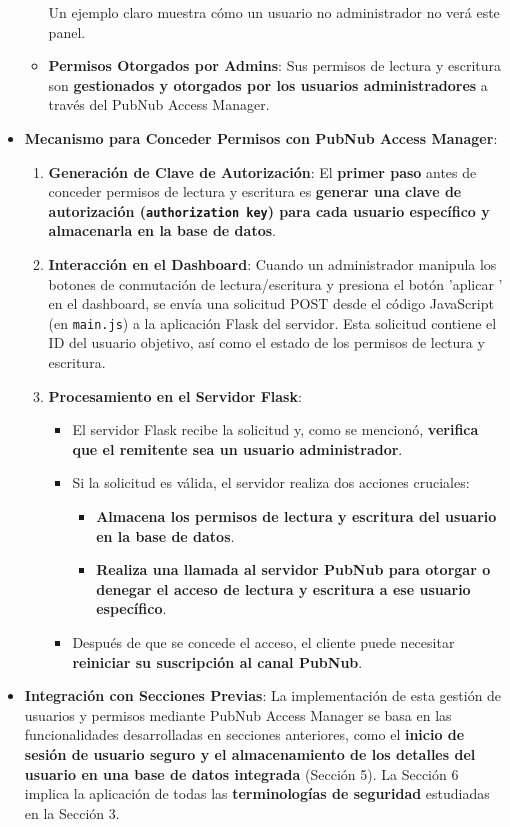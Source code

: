 \documentclass{report}
\begin{document}
\begin{itemize}
\begin{itemize}
        Un ejemplo claro muestra cómo un usuario no administrador no verá este panel.
        \item \textbf{Permisos Otorgados por Admins}: Sus permisos de lectura y escritura son \textbf{gestionados y otorgados por los usuarios 
        administradores} a través del PubNub Access Manager.
    \end{itemize}
    \item \textbf{Mecanismo para Conceder Permisos con PubNub Access Manager}:
    \begin{enumerate}
        \item \textbf{Generación de Clave de Autorización}: El \textbf{primer paso} antes de conceder permisos de lectura y escritura es \textbf{generar una 
        clave de autorización (\texttt{authorization key}) para cada usuario específico y almacenarla en la base de datos}.
        \item \textbf{Interacción en el Dashboard}: Cuando un administrador manipula los botones de conmutación de lectura/escritura y presiona el botón  
        'aplicar ' en el dashboard, se envía una solicitud POST desde el código JavaScript (en \texttt{main.js}) a la aplicación Flask del servidor. Esta 
        solicitud contiene el ID del usuario objetivo, así como el estado de los permisos de lectura y escritura.
        \item \textbf{Procesamiento en el Servidor Flask}:
        \begin{itemize}
            \item El servidor Flask recibe la solicitud y, como se mencionó, \textbf{verifica que el remitente sea un usuario administrador}.
            \item Si la solicitud es válida, el servidor realiza dos acciones cruciales:
            \begin{itemize}
                \item \textbf{Almacena los permisos de lectura y escritura del usuario en la base de datos}.
                \item \textbf{Realiza una llamada al servidor PubNub para otorgar o denegar el acceso de lectura y escritura a ese usuario específico}.
            \end{itemize}
            \item Después de que se concede el acceso, el cliente puede necesitar \textbf{reiniciar su suscripción al canal PubNub}.
        \end{itemize}
    \end{enumerate}
    \item \textbf{Integración con Secciones Previas}: La implementación de esta gestión de usuarios y permisos mediante PubNub Access Manager se basa 
    en las funcionalidades desarrolladas en secciones anteriores, como el \textbf{inicio de sesión de usuario seguro y el almacenamiento de los detalles 
    del usuario en una base de datos integrada} (Sección 5). La Sección 6 implica la aplicación de todas las \textbf{terminologías de seguridad} 
    estudiadas en la Sección 3.
\end{itemize}
\end{document}
